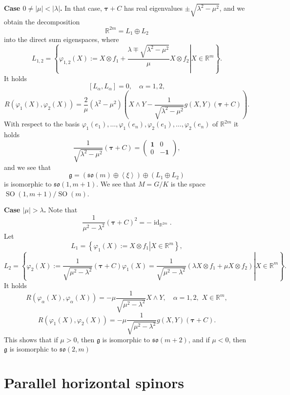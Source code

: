 \documentclass{amsart}
\theoremstyle{plain}
\theoremstyle{definition}
\newcommand{\SO}{\operatorname{SO}}
\newcommand{\id}{\operatorname{id}}
\def\so{\mathfrak{so}}
\newcommand{\bt}{{\boldsymbol{\tau}}}
\newcommand{\Real}{\mathbb{R}}
\newcommand{\1}{\mathbf{1}}
\newcommand{\g}{\mathfrak{g}}
\newcommand{\+}{\oplus}
\begin{document}
{\bf Case $0\neq |\mu|<|\lambda|$.} In that case, $\bt+C$ has real eigenvalues $\pm\sqrt{\lambda^2-\mu^2}$, and 
we obtain the decomposition 
$$\Real^{2m}=L_1\oplus L_2$$ into the direct sum eigenspaces, where
$$L_{1,2}=\left.\left\{ \varphi_{1,2}(X):=X\otimes f_1+\frac{\lambda\mp \sqrt{\lambda^2-\mu^2}}{\mu}X\otimes f_2\right| X\in\Real^m   \right\}.$$
It holds $$[L_\alpha,L_\alpha]=0,\quad \alpha=1,2,$$
$$R(\varphi_1(X),\varphi_2(X))=\frac{2}{\mu}(\lambda^2-\mu^2)\left(X\wedge Y-\frac{1}{\sqrt{\lambda^2-\mu^2}}g(X,Y)(\bt+C)\right).$$
With respect to the basis $\varphi_1(e_1),\dots,\varphi_1(e_n),\varphi_2(e_1),\dots,\varphi_2(e_n)$ of  $\Real^{2m}$ it holds
$$\frac{1}{\sqrt{\lambda^2-\mu^2}}(\bt+C)=\left(\begin{matrix}\1&0\\0&-\1\end{matrix}\right),$$
and we see that $$\g=(\so(m)\oplus\left<\xi\right>)\oplus (L_1\oplus L_2)$$ is isomorphic to $\so(1,m+1)$.
We see that 
$M=G/K$ is the space $\SO(1,m+1)/\SO(m)$. 

\bigskip

{\bf Case $|\mu|>\lambda$.}
Note that $$\frac{1}{\mu^2-\lambda^2}(\bt+C)^2=-\id_{\Real^{2m}}.$$
Let $$L_{1}=\left.\left\{ \varphi_{1}(X):=X\otimes f_1\right| X\in\Real^m   \right\},$$
$$L_{2}=\left.\left\{ \varphi_{2}(X):=\frac{1}{\sqrt{\mu^2-\lambda^2}}(\bt+C)\varphi_1(X)=\frac{1}{\sqrt{\mu^2-\lambda^2}}(\lambda X\otimes f_1+\mu X\otimes f_2)\right| X\in\Real^m   \right\}.$$
It holds 
$$R(\varphi_\alpha(X),\varphi_\alpha(X))=-\mu\frac{1}{\sqrt{\mu^2-\lambda^2}} X\wedge Y,\quad \alpha =1,2,\,\,X\in\Real^m,$$
$$R(\varphi_1(X),\varphi_2(X))=-\mu\frac{1}{\sqrt{\mu^2-\lambda^2}}g(X,Y)(\bt+C).$$
This shows that if $\mu>0$, then $\g$ is isomorphic to $\so(m+2)$, and if 
$\mu<0$, then $\g$ is isomorphic to $\so(2,m)$





























\section{Parallel horizontal spinors}\label{secSpinors}
\end{document}
